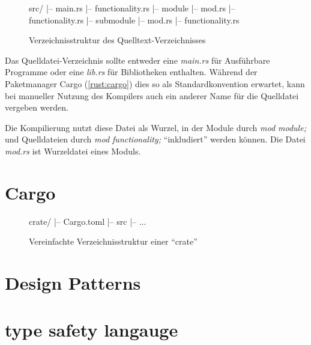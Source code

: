 \begin{wrapfigure}{l}[-1em]{.4\textwidth}
	\begin{rustc}
		src/
		|-- main.rs
		|-- functionality.rs
		|-- module
		    |-- mod.rs
		    |-- functionality.rs
		    |-- submodule
		        |-- mod.rs
		        |-- functionality.rs
	\end{rustc}
	\caption{Verzeichnisstruktur des Quelltext-Verzeichnisses}
\end{wrapfigure}


Das Quelldatei-Verzeichnis sollte entweder eine \textit{main.rs} für Ausführbare Programme oder eine \textit{lib.rs} für Bibliotheken enthalten.
Während der Paketmanager Cargo (\autoref{rust:cargo}) dies so als Standardkonvention erwartet, kann bei manueller Nutzung des Kompilers auch ein anderer Name für die Quelldatei vergeben werden.

Die Kompilierung nutzt diese Datei als Wurzel, in der Module durch \textit{mod module;} und Quelldateien durch \textit{mod functionality;} \enquote{inkludiert} werden können.
Die Datei \textit{mod.rs} ist Wurzeldatei eines Moduls. 


\section{Cargo}
\label{rust:cargo}

\begin{wrapfigure}{r}[-1em]{.4\textwidth}
	\hspace{1em}
	\begin{rustc}
		crate/
		|-- Cargo.toml
		|-- src
		    |-- ...
	\end{rustc}
	\caption{Vereinfachte Verzeichnisstruktur einer \enquote{crate}}
\end{wrapfigure}



\section{Design Patterns}



\section{type safety langauge}
